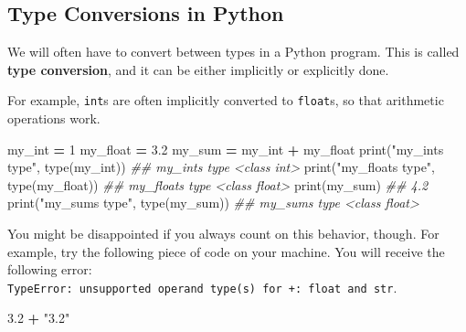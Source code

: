 \documentclass[
  12pt,
  krantz2]{krantz}
\makeatletter
\newenvironment{Shaded}{\begin{snugshade}}{\end{snugshade}}
\newcommand{\BuiltInTok}[1]{#1}
\newcommand{\CommentTok}[1]{\textcolor[rgb]{0.37,0.37,0.37}{\textit{#1}}}
\newcommand{\DecValTok}[1]{\textcolor[rgb]{0.06,0.06,0.06}{#1}}
\newcommand{\FloatTok}[1]{\textcolor[rgb]{0.06,0.06,0.06}{#1}}
\newcommand{\NormalTok}[1]{#1}
\newcommand{\OperatorTok}[1]{\textcolor[rgb]{0.43,0.43,0.43}{\textbf{#1}}}
\newcommand{\StringTok}[1]{\textcolor[rgb]{0.5,0.5,0.5}{#1}}
\newenvironment{kframe}{%
\medskip{}
\setlength{\fboxsep}{.8em}
 \def\at@end@of@kframe{}%
 \ifinner\ifhmode%
  \def\at@end@of@kframe{\end{minipage}}%
  \begin{minipage}{\columnwidth}%
 \fi\fi%
 \def\FrameCommand##1{\hskip\@totalleftmargin \hskip-\fboxsep
 \colorbox{shadecolor}{##1}\hskip-\fboxsep
     \hskip-\linewidth \hskip-\@totalleftmargin \hskip\columnwidth}%
 \MakeFramed {\advance\hsize-\width
   \@totalleftmargin\z@ \linewidth\hsize
   \@setminipage}}%
 {\par\unskip\endMakeFramed%
 \at@end@of@kframe}
\renewenvironment{Shaded}{\begin{kframe}}{\end{kframe}}
\makeatother
\begin{document}
\hypertarget{type-conversions-in-python}{%
\subsection{Type Conversions in Python}\label{type-conversions-in-python}}

We will often have to convert between types in a Python program. This is called \textbf{type conversion}, and it can be either implicitly or explicitly done.

For example, \texttt{int}s are often implicitly converted to \texttt{float}s, so that arithmetic operations work.

\begin{Shaded}
\begin{Highlighting}[]
\NormalTok{my\_int }\OperatorTok{=} \DecValTok{1}
\NormalTok{my\_float }\OperatorTok{=} \FloatTok{3.2}
\NormalTok{my\_sum }\OperatorTok{=}\NormalTok{ my\_int }\OperatorTok{+}\NormalTok{ my\_float}
\BuiltInTok{print}\NormalTok{(}\StringTok{"my\_int\textquotesingle{}s type"}\NormalTok{, }\BuiltInTok{type}\NormalTok{(my\_int))}
\CommentTok{\#\# my\_int\textquotesingle{}s type \textless{}class \textquotesingle{}int\textquotesingle{}\textgreater{}}
\BuiltInTok{print}\NormalTok{(}\StringTok{"my\_float\textquotesingle{}s type"}\NormalTok{, }\BuiltInTok{type}\NormalTok{(my\_float))}
\CommentTok{\#\# my\_float\textquotesingle{}s type \textless{}class \textquotesingle{}float\textquotesingle{}\textgreater{}}
\BuiltInTok{print}\NormalTok{(my\_sum)}
\CommentTok{\#\# 4.2}
\BuiltInTok{print}\NormalTok{(}\StringTok{"my\_sum\textquotesingle{}s type"}\NormalTok{, }\BuiltInTok{type}\NormalTok{(my\_sum))}
\CommentTok{\#\# my\_sum\textquotesingle{}s type \textless{}class \textquotesingle{}float\textquotesingle{}\textgreater{}}
\end{Highlighting}
\end{Shaded}

You might be disappointed if you always count on this behavior, though. For example, try the following piece of code on your machine. You will receive the following error: \texttt{TypeError:\ unsupported\ operand\ type(s)\ for\ +:\ \textquotesingle{}float\textquotesingle{}\ and\ \textquotesingle{}str\textquotesingle{}}.

\begin{Shaded}
\begin{Highlighting}[]
\FloatTok{3.2} \OperatorTok{+} \StringTok{"3.2"}
\end{Highlighting}
\end{Shaded}
\end{document}
